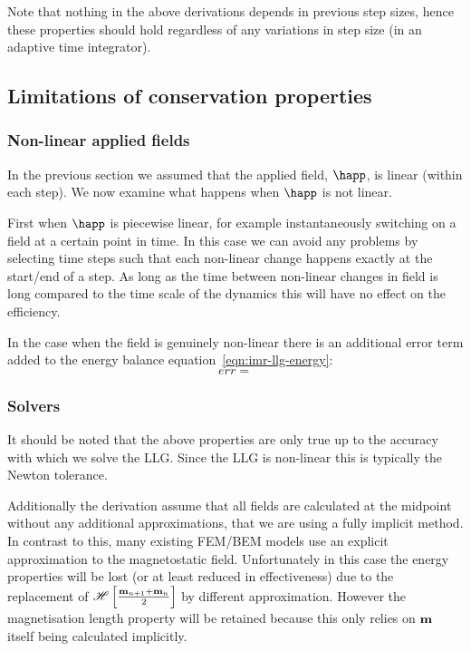 Note that nothing in the above derivations depends in previous step sizes, hence these properties should hold regardless of any variations in step size (\ie in an adaptive time integrator).


\subsection{Limitations of conservation properties}

\subsubsection{Non-linear applied fields}
\label{sec:non-linear-applied}

In the previous section we assumed that the applied field, $\happ$, is linear (within each step).
We now examine what happens when $\happ$ is not linear.

First when $\happ$ is piecewise linear, for example instantaneously switching on a field at a certain point in time.
In this case we can avoid any problems by selecting time steps such that each non-linear change happens exactly at the start/end of a step.
As long as the time between non-linear changes in field is long compared to the time scale of the dynamics this will have no effect on the efficiency.

In the case when the field is genuinely non-linear there is an additional error term added to the energy balance equation~\eqref{eqn:imr-llg-energy}:
\begin{equation}
  err =
\end{equation}






\subsubsection{Solvers}

It should be noted that the above properties are only true up to the accuracy with which we solve the LLG. Since the LLG is non-linear this is typically the Newton tolerance.

Additionally the derivation assume that all fields are calculated at the midpoint without any additional approximations, \ie that we are using a fully implicit method.
In contrast to this, many existing FEM/BEM models use an explicit approximation to the magnetostatic field.
Unfortunately in this case the energy properties will be lost (or at least reduced in effectiveness) due to the replacement of $\mathscr{H} \left[ \frac{\mathbf{m}_{n+1} + \mathbf{m}_n}{2} \right]$ by different approximation.
However the magnetisation length property will be retained because this only relies on $\mathbf{m}$ itself being calculated implicitly.

